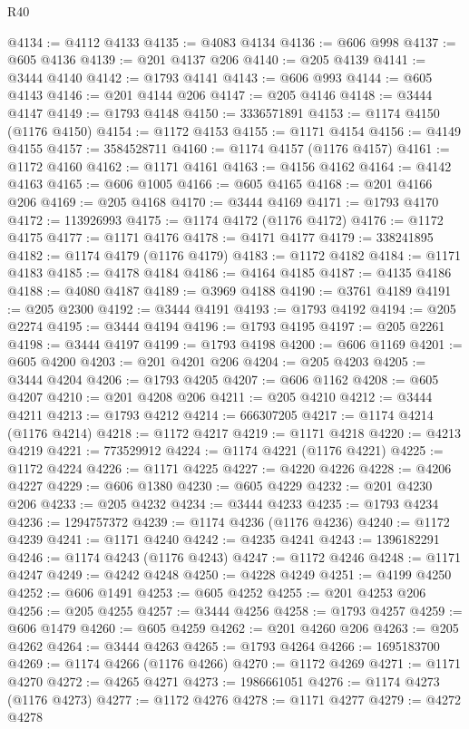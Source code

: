 \begin{lexlean}{R40}
\begin{coremodule}
@4134 := @4112 @4133
@4135 := @4083 @4134
@4136 := @606 @998
@4137 := @605 @4136
@4139 := @201 @4137 @206
@4140 := @205 @4139
@4141 := @3444 @4140
@4142 := @1793 @4141
@4143 := @606 @993
@4144 := @605 @4143
@4146 := @201 @4144 @206
@4147 := @205 @4146
@4148 := @3444 @4147
@4149 := @1793 @4148
@4150 := 3336571891
@4153 := @1174 @4150 (@1176 @4150)
@4154 := @1172 @4153
@4155 := @1171 @4154
@4156 := @4149 @4155
@4157 := 3584528711
@4160 := @1174 @4157 (@1176 @4157)
@4161 := @1172 @4160
@4162 := @1171 @4161
@4163 := @4156 @4162
@4164 := @4142 @4163
@4165 := @606 @1005
@4166 := @605 @4165
@4168 := @201 @4166 @206
@4169 := @205 @4168
@4170 := @3444 @4169
@4171 := @1793 @4170
@4172 := 113926993
@4175 := @1174 @4172 (@1176 @4172)
@4176 := @1172 @4175
@4177 := @1171 @4176
@4178 := @4171 @4177
@4179 := 338241895
@4182 := @1174 @4179 (@1176 @4179)
@4183 := @1172 @4182
@4184 := @1171 @4183
@4185 := @4178 @4184
@4186 := @4164 @4185
@4187 := @4135 @4186
@4188 := @4080 @4187
@4189 := @3969 @4188
@4190 := @3761 @4189
@4191 := @205 @2300
@4192 := @3444 @4191
@4193 := @1793 @4192
@4194 := @205 @2274
@4195 := @3444 @4194
@4196 := @1793 @4195
@4197 := @205 @2261
@4198 := @3444 @4197
@4199 := @1793 @4198
@4200 := @606 @1169
@4201 := @605 @4200
@4203 := @201 @4201 @206
@4204 := @205 @4203
@4205 := @3444 @4204
@4206 := @1793 @4205
@4207 := @606 @1162
@4208 := @605 @4207
@4210 := @201 @4208 @206
@4211 := @205 @4210
@4212 := @3444 @4211
@4213 := @1793 @4212
@4214 := 666307205
@4217 := @1174 @4214 (@1176 @4214)
@4218 := @1172 @4217
@4219 := @1171 @4218
@4220 := @4213 @4219
@4221 := 773529912
@4224 := @1174 @4221 (@1176 @4221)
@4225 := @1172 @4224
@4226 := @1171 @4225
@4227 := @4220 @4226
@4228 := @4206 @4227
@4229 := @606 @1380
@4230 := @605 @4229
@4232 := @201 @4230 @206
@4233 := @205 @4232
@4234 := @3444 @4233
@4235 := @1793 @4234
@4236 := 1294757372
@4239 := @1174 @4236 (@1176 @4236)
@4240 := @1172 @4239
@4241 := @1171 @4240
@4242 := @4235 @4241
@4243 := 1396182291
@4246 := @1174 @4243 (@1176 @4243)
@4247 := @1172 @4246
@4248 := @1171 @4247
@4249 := @4242 @4248
@4250 := @4228 @4249
@4251 := @4199 @4250
@4252 := @606 @1491
@4253 := @605 @4252
@4255 := @201 @4253 @206
@4256 := @205 @4255
@4257 := @3444 @4256
@4258 := @1793 @4257
@4259 := @606 @1479
@4260 := @605 @4259
@4262 := @201 @4260 @206
@4263 := @205 @4262
@4264 := @3444 @4263
@4265 := @1793 @4264
@4266 := 1695183700
@4269 := @1174 @4266 (@1176 @4266)
@4270 := @1172 @4269
@4271 := @1171 @4270
@4272 := @4265 @4271
@4273 := 1986661051
@4276 := @1174 @4273 (@1176 @4273)
@4277 := @1172 @4276
@4278 := @1171 @4277
@4279 := @4272 @4278

\end{coremodule}
\end{lexlean}
